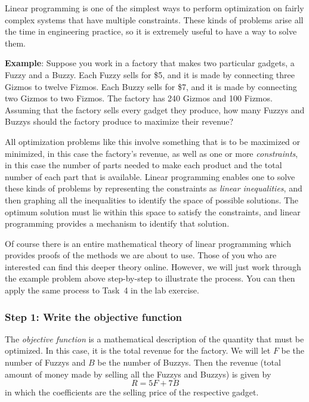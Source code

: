 \documentclass{article}
\begin{document}
Linear programming is one of the simplest ways to perform optimization on fairly complex systems
that have multiple constraints.  These kinds of problems arise all the time in engineering
practice, so it is extremely useful to have a way to solve them.

\textbf{Example}: Suppose you work in a factory that makes two
particular gadgets, a Fuzzy and a Buzzy.  Each Fuzzy sells for \$5, and it is made by
connecting three Gizmos to twelve Fizmos.  Each Buzzy sells for \$7, and it is made by
connecting two Gizmos to two Fizmos.  The factory has 240 Gizmos and 100 Fizmos. 
Assuming that the factory sells every gadget they produce, how many Fuzzys and Buzzys
should the factory produce to maximize their revenue?

All optimization problems like this involve something that is to be maximized or minimized,
in this case the factory's revenue, as well as one or more \textit{constraints}, in this
case the number of parts needed to make each product and the total number of each part
that is available.  Linear programming enables one to solve these kinds of problems by
representing the constraints as \textit{linear inequalities}, and then graphing all the
inequalities to identify the space of possible solutions.  The optimum solution must 
lie within this space to satisfy the constraints, and linear programming provides
a mechanism to identify that solution.

Of course there is an entire mathematical theory of linear programming which provides
proofs of the methods we are about to use.  Those of you who are interested can find
this deeper theory online.
However, we will just work through the example problem above step-by-step to illustrate
the process.  You can then apply the same process to Task~4 in the lab exercise.

\subsubsection*{Step 1: Write the objective function}
The \textit{objective function} is a mathematical description of the quantity that must
be optimized.  In this case, it is the total revenue for the factory.  We will let
$F$ be the number of Fuzzys and $B$ be the number of Buzzys.  Then the revenue (total
amount of money made by selling all the Fuzzys and Buzzys) is given by
\begin{equation}
    R = 5 F + 7 B
    \label{eq:objectivefn}
\end{equation}
in which the coefficients are the selling price of the respective gadget.
\end{document}
